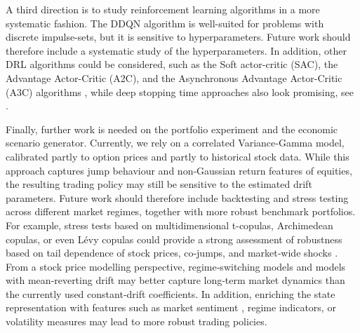 A third direction is to study reinforcement learning algorithms in a more systematic fashion. The DDQN algorithm is well-suited for problems with discrete impulse-sets, but it is sensitive to hyperparameters. Future work should therefore include a systematic study of the hyperparameters. In addition, other DRL algorithms could be considered, such as the Soft actor-critic (SAC), the Advantage Actor-Critic (A2C), and the Asynchronous Advantage Actor-Critic (A3C) algorithms \cite{A3C16, haarnoja2018soft}, while deep stopping time approaches also look promising, see \cite{becker2019deep, han2023new, lauriere2025deep}.

Finally, further work is needed on the portfolio experiment and the economic scenario generator. Currently, we rely on a correlated Variance‑Gamma model, calibrated partly to option prices and partly to historical stock data. While this approach captures jump behaviour and non‑Gaussian return features of equities, the resulting trading policy may still be sensitive to the estimated drift parameters. Future work should therefore include backtesting and stress testing across different market regimes, together with more robust benchmark portfolios. For example, stress tests based on multidimensional t-copulas, Archimedean copulas, or even Lévy copulas could provide a strong assessment of robustness based on tail dependence of stock prices, co‑jumps, and market‑wide shocks \cite{mcneil2015quantitative, tankov2004simulation, KALLSEN20061551, GROTHE2015182}. From a stock price modelling perspective, regime‑switching models \cite{korn2017stochastic, das2018risk, wu2025recursive} and models with mean‑reverting drift may better capture long‑term market dynamics than the currently used constant‑drift coefficients. In addition, enriching the state representation with features such as market sentiment \cite{MAO2024102048}, regime indicators, or volatility measures may lead to more robust trading policies.